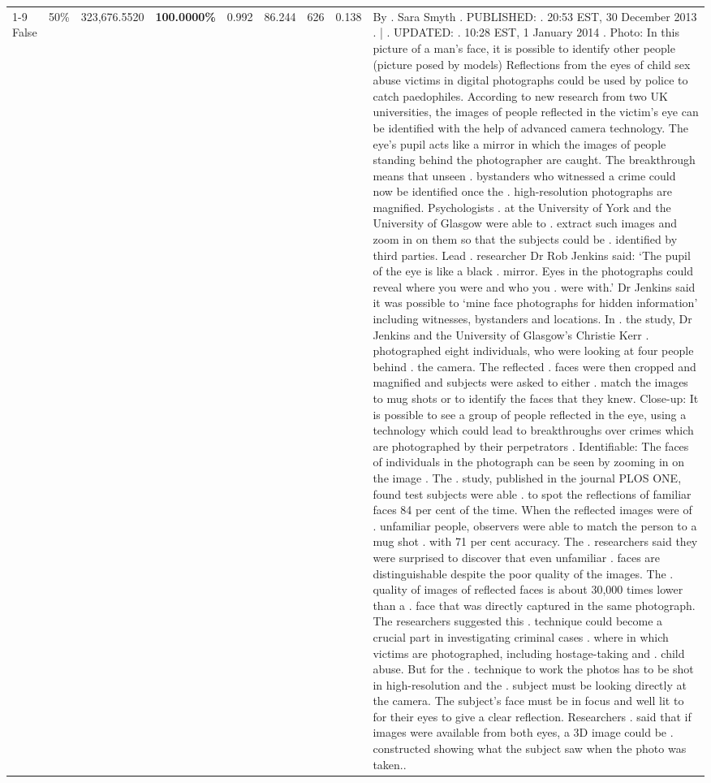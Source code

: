 \begin{table}[H]
\begin{tabular}{lllrlllll}
\cline{1-9} \cline{2-9}
False & 50\% & 323,676.5520 & \bfseries \color{red} 100.0000\% & 0.992 & 86.244 & 626 & 0.138 & By . Sara Smyth . PUBLISHED: . 20:53 EST, 30 December 2013 . | . UPDATED: . 10:28 EST, 1 January 2014 . Photo: In this picture of a man's face, it is possible to identify other people (picture posed by models) Reflections from the eyes of child sex abuse victims in digital photographs could be used by police to catch paedophiles. According to new research from two UK universities, the images of people reflected in the victim's eye can be identified with the help of advanced camera technology. The eye's pupil acts like a mirror in which the images of people standing behind the photographer are caught. The breakthrough means that unseen . bystanders who witnessed a crime could now be identified once the . high-resolution photographs are magnified. Psychologists . at the University of York and the University of Glasgow were able to . extract such images and zoom in on them so that the subjects could be . identified by third parties. Lead . researcher Dr Rob Jenkins said: ‘The pupil of the eye is like a black . mirror. Eyes in the photographs could reveal where you were and who you . were with.' Dr Jenkins said it was possible to ‘mine face photographs for hidden information' including witnesses, bystanders and locations. In . the study, Dr Jenkins and the University of Glasgow's Christie Kerr . photographed eight individuals, who were looking at four people behind . the camera. The reflected . faces were then cropped and magnified and subjects were asked to either . match the images to mug shots or to identify the faces that they knew. Close-up: It is possible to see a group of people reflected in the eye, using a technology which could lead to breakthroughs over crimes which are photographed by their perpetrators . Identifiable: The faces of individuals in the photograph can be seen by zooming in on the image . The . study, published in the journal PLOS ONE, found test subjects were able . to spot the reflections of familiar faces 84 per cent of the time. When the reflected images were of . unfamiliar people, observers were able to match the person to a mug shot . with 71 per cent accuracy. The . researchers said they were surprised to discover that even unfamiliar . faces are distinguishable despite the poor quality of the images. The . quality of images of reflected faces is about 30,000 times lower than a . face that was directly captured in the same photograph. The researchers suggested this . technique could become a crucial part in investigating criminal cases . where in which victims are photographed, including hostage-taking and . child abuse. But for the . technique to work the photos has to be shot in high-resolution and the . subject must be looking directly at the camera. The subject's face must be in focus and well lit to for their eyes to give a clear reflection. Researchers . said that if images were available from both eyes, a 3D image could be . constructed showing what the subject saw when the photo was taken.. \\

\end{tabular}
\end{table}
